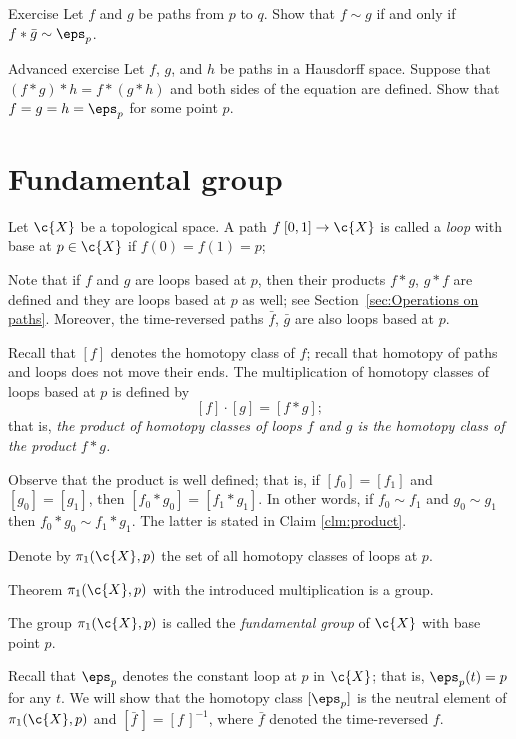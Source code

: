 \begin{thm}{Exercise}
Let $f$ and $g$ be paths from $p$ to $q$.
Show that $f\sim g$ if and only if $f*\bar g\sim \eps_p$.
\end{thm}


\begin{thm}{Advanced exercise}\label{ex:assoc}
Let $f$, $g$, and $h$ be paths in a Hausdorff space.
Suppose that $(f*g)*h= f*(g*h)$
and both sides of the equation are defined.
Show that $f=g=h=\eps_p$ for some point $p$.
\end{thm}


\section{Fundamental group}

Let $\c{X}$ be a topological space.
A path $f\:[0,1]\to\c{X}$ is called a \emph{loop} with base at $p\in\c{X}$ if $f(0)=f(1)=p$;


Note that if $f$ and $g$ are loops based at $p$, then their products $f*g$, $g*f$ are defined and they are loops based at $p$ as well; see Section~\ref{sec:Operations on paths}.
Moreover, the time-reversed paths $\bar f$, $\bar g$ are also loops based at $p$.


Recall that $[f]$ denotes the homotopy class of $f$; recall that homotopy of paths and loops does not move their ends. 
The multiplication of homotopy classes of loops based at $p$ is defined by 
\[[f]\cdot [g]=[f*g];\]
that is, \textit{the product of homotopy classes of loops $f$ and $g$ is the homotopy class of the product $f*g$.}

Observe that the product is well defined;
that is, if $[f_0]= [f_1]$ and $[g_0]=[g_1]$, then  $[f_0*g_0]=[f_1*g_1]$.
In other words, if $f_0\sim f_1$ and $g_0\sim g_1$ then $f_0*g_0\sim f_1*g_1$.
The latter is stated in Claim \ref{clm:product}.

Denote by $\pi_1(\c{X},p)$ the set of all homotopy classes of loops at $p$.

\begin{thm}{Theorem}
$\pi_1(\c{X},p)$ with the introduced multiplication is a group.
\end{thm}

The group $\pi_1(\c{X},p)$ is called the \emph{fundamental group} of $\c{X}$ with base point $p$.

Recall that $\eps_p$ denotes the constant loop at $p$ in $\c{X}$;
that is, $\eps_p(t)=p$ for any $t$.
We will show that the homotopy class $[\eps_p]$ is the neutral element of $\pi_1(\c{X},p)$
and $[\bar f\,]=[f\,]^{-1}$, where $\bar f$ denoted the time-reversed $f$.

